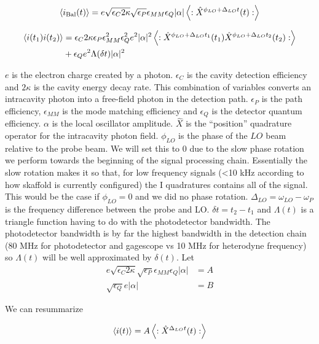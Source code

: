\documentclass[12pt]{article}
\begin{document}
\begin{align}
\braket{i_{\text{Bal}}(t)} = e\sqrt{\epsilon_{C}2\kappa} \sqrt{\epsilon_{P}} \epsilon_{MM} \epsilon_{Q} |\alpha| \left<: \hat{X}^{\phi_{LO}+\Delta_{LO}t}(t):\right>
\end{align}

\begin{align}
\braket{i(t_1)i(t_2)} & = \epsilon_{C}2\kappa\epsilon_{P}\epsilon_{MM}^2\epsilon_{Q}^2 e^2 |\alpha|^2 \left<:\hat{X}^{\phi_{LO}+\Delta_{LO}t_1}(t_1)\hat{X}^{\phi_{LO}+\Delta_{LO}t_2}(t_2):\right>\\
&+\epsilon_Qe^2\Lambda(\delta t)|\alpha|^2
\end{align}

$e$ is the electron charge created by a photon. $\epsilon_C$ is the cavity detection efficiency and $2\kappa$ is the cavity energy decay rate. This combination of variables converts an intracavity photon into a free-field photon in the detection path. $\epsilon_P$ is the path efficiency, $\epsilon_{MM}$ is the mode matching efficiency and $\epsilon_Q$ is the detector quantum efficiency. $\alpha$ is the local oscillator amplitude. $\hat{X}$ is the ``position'' quadrature operator for the intracavity photon field. $\phi_{LO}$ is the phase of the $LO$ beam relative to the probe beam. We will set this to 0 due to the slow phase rotation we perform towards the beginning of the signal processing chain. Essentially the slow rotation makes it so that, for low frequency signals (\textless 10 kHz according to how skaffold is currently configured) the I quadratures contains all of the signal. This would be the case if $\phi_{LO}=0$ and we did no phase rotation. $\Delta_{LO}=\omega_{LO}-\omega_{P}$ is the frequency difference between the probe and LO. $\delta t = t_2-t_1$ and $\Lambda(t)$ is a triangle function having to do with the photodetector bandwidth. The photodetector bandwidth is by far the highest bandwidth in the detection chain (80 MHz for photodetector and gagescope vs 10 MHz for heterodyne frequency) so $\Lambda(t)$ will be well approximated by $\delta(t)$.
Let
\begin{align}
e \sqrt{\epsilon_C 2 \kappa} \sqrt{\epsilon_P} \epsilon_{MM} \epsilon_Q |\alpha| &= A\\
\sqrt{\epsilon_Q} e |\alpha| &=B
\end{align}

We can resummarize

\begin{align}
\braket{i(t)} = A \left<: \hat{X}^{\Delta_{LO}t}(t):\right>
\end{align}
\end{document}
